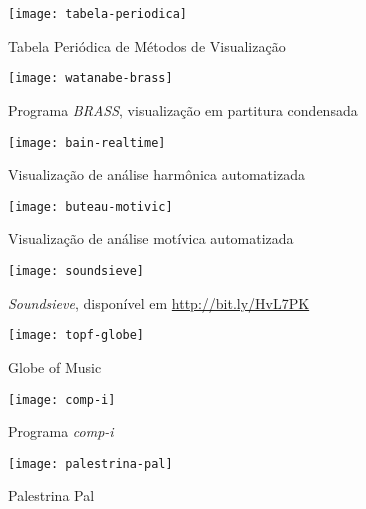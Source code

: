 \documentclass{sciposter}
\begin{document}
\begin{multicols}{2}

\begin{figure}
  \centering
  \texttt{[image: tabela-periodica]}
  \caption{Tabela Periódica de Métodos de Visualização \cite{Lengler2007}}
  \label{fig:label-figura}
\end{figure}

\begin{figure}
  \centering
  \texttt{[image: watanabe-brass]}
  \caption{Programa \textit{BRASS}, visualização em partitura condensada \cite{Watanabe2003}}
  \label{fig:label-figura}
\end{figure}

\begin{figure}
  \centering
  \texttt{[image: bain-realtime]}
  \caption{Visualização de análise harmônica automatizada \cite{Bain2008}}
  \label{fig:label-figura}
\end{figure}

\begin{figure}
  \centering
  \texttt{[image: buteau-motivic]}
  \caption{Visualização de análise motívica automatizada \cite{Buteau2005}}
  \label{fig:label-figura}
\end{figure}

\begin{figure}
  \centering
  \texttt{[image: soundsieve]}
  \caption{\textit{Soundsieve}, disponível em \url{http://bit.ly/HvL7PK}}
  \label{fig:label-figura}
\end{figure}

\begin{figure}
  \centering
  \texttt{[image: topf-globe]}
  \caption{Globe of Music \cite{Leitich2007}}
  \label{fig:label-figura}
\end{figure}

\begin{figure}
  \centering
  \texttt{[image: comp-i]}
  \caption{Programa \textit{comp-i} \cite{Miyazaki2004}}
  \label{fig:label-figura}
\end{figure}

\begin{figure}
  \centering
  \texttt{[image: palestrina-pal]}
  \caption{Palestrina Pal \cite{Gramit2005}}
  \label{fig:label-figura}
\end{figure}

\end{multicols}
\end{document}
